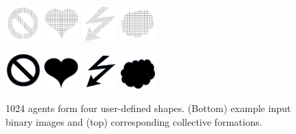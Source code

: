 \documentclass[journal]{IEEEtran}
\begin{document}
\begin{figure}
{\includegraphics[width=0.12\textwidth]{editor/grids/0.jpeg}}\hfill
{\includegraphics[width=0.12\textwidth]{editor/grids/2.jpeg}}\hfill
{\includegraphics[width=0.12\textwidth]{editor/grids/1.jpeg}}\hfill
{\includegraphics[width=0.12\textwidth]{editor/grids/3.jpeg}}

{\includegraphics[width=0.12\textwidth]{editor/grids/test4.png}}\hfill
{\includegraphics[width=0.12\textwidth]{editor/grids/test1.png}}\hfill
{\includegraphics[width=0.12\textwidth]{editor/grids/test3.png}}\hfill
{\includegraphics[width=0.12\textwidth]{editor/grids/test2.png}}\hfill
\caption{1024 agents form four user-defined shapes. (Bottom) example input binary images and (top) corresponding collective formations.}
\label{fig:tranform}
\end{figure}
\end{document}
